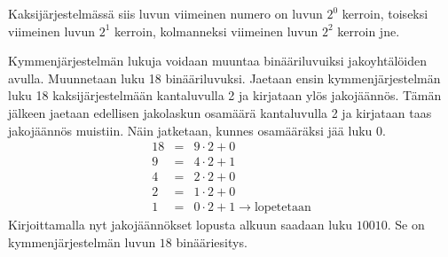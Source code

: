 \begin{kotitehtavasivu}
\begin{tehtava}
	Kaksijärjestelmässä siis luvun viimeinen numero on luvun $2^0$ kerroin, toiseksi viimeinen luvun $2^1$ kerroin, kolmanneksi viimeinen luvun $2^2$ kerroin jne.

	Kymmenjärjestelmän lukuja voidaan muuntaa binääriluvuiksi jakoyhtälöiden avulla. Muunnetaan luku 18 binääriluvuksi. Jaetaan ensin kymmenjärjestelmän luku 18 kaksijärjestelmään kantaluvulla 2 ja kirjataan ylös jakojäännös. Tämän jälkeen jaetaan edellisen jakolaskun osamäärä kantaluvulla 2 ja kirjataan taas jakojäännös muistiin. Näin jatketaan, kunnes osamääräksi jää luku 0. 
	\begin{eqnarray*}
	18&=&9\cdot 2+0\\
	9&=&4\cdot 2+1\\
	4&=&2\cdot 2+0\\
	2&=&1\cdot 2+0\\
	1&=&0\cdot2+1 \to \textrm{lopetetaan}
	\end{eqnarray*}
	Kirjoittamalla nyt jakojäännökset lopusta alkuun saadaan luku $10010$. Se on kymmenjärjestelmän luvun $18$ binääriesitys.
\end{tehtava}

\end{kotitehtavasivu}
